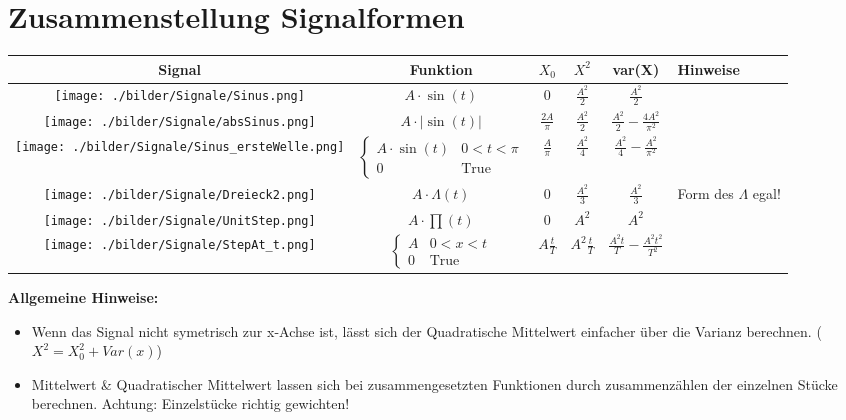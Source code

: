 \section{Zusammenstellung Signalformen}
\begin{table}[htdp]
\begin{center}
\begin{tabular}{|c|c|c|c|c|p{6cm}|}
\hline
\textbf{Signal} & \textbf{Funktion} & \textbf{$X_0$} & \textbf{$X^2$} & \textbf{var(X)} & \textbf{Hinweise} \\

\hline
\parbox[c][2.1cm]{3.5cm}{\texttt{[image: ./bilder/Signale/Sinus.png]}} &
$A\cdot\sin(t)$  & $0$ &
$\frac{A^2}{2}$ & $\frac{A^2}{2}$
&  \\

\hline
\parbox[c][2.1cm]{3.5cm}{\texttt{[image: ./bilder/Signale/absSinus.png]}} &
$A\cdot|\sin(t)|$  &
$\frac{2A}{\pi}$ & $\frac{A^2}{2}$ & $\frac{A^2}{2}-\frac{4A^2}{\pi^2}$
& \\

\hline
\parbox[c][2.1cm]{3.5cm}{\texttt{[image: ./bilder/Signale/Sinus\_ersteWelle.png]}} &
$\begin{cases} A\cdot\sin (t) & 0<t<\pi  \\ 0 & \text{True}\end{cases}$ & $\frac{A}{\pi}$ &
$\frac{A^2}{4}$ & $\frac{A^2}{4}-\frac{A^2}{\pi^2}$
& \\

\hline
\parbox[c][2.1cm]{3.5cm}{\texttt{[image: ./bilder/Signale/Dreieck2.png]}} &
$A\cdot\Lambda(t)$
& $0$ & $\frac{A^2}{3}$ &
$\frac{A^2}{3}$
& Form des $\Lambda$ egal! \\

\hline
\parbox[c][2.1cm]{3.5cm}{\texttt{[image: ./bilder/Signale/UnitStep.png]}} &
$A\cdot\prod(t)$
& $0$ & $A^2$ & $A^2$
& \\

\hline
\parbox[c][2.1cm]{3.5cm}{\texttt{[image: ./bilder/Signale/StepAt\_t.png]}} &
$\begin{cases} A & 0<x<t \\ 0 & \text{True}\end{cases}$ 
& $A\frac{t}{T}$ &
$A^2\frac{t}{T}$ & $\frac{A^2t}{T}-\frac{A^2t^2}{T^2}$
& \\

\hline
\end{tabular}
\end{center}
\end{table}

\textbf{Allgemeine Hinweise:}
\begin{itemize}
  \item Wenn das Signal nicht symetrisch zur x-Achse ist, lässt sich der Quadratische Mittelwert einfacher über die
  Varianz berechnen. ($X^2 = X_0^2 + Var(x)$)
  \item Mittelwert \& Quadratischer Mittelwert lassen sich bei zusammengesetzten Funktionen durch zusammenzählen der
  einzelnen Stücke berechnen. Achtung: Einzelstücke richtig gewichten!
\end{itemize}